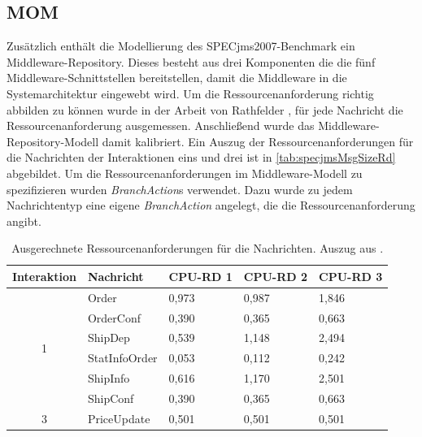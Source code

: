 \subsection{MOM}
Zusätzlich enthält die Modellierung des SPECjms2007-Benchmark ein Middleware-Repository. Dieses besteht aus drei Komponenten die die fünf Middleware-Schnittstellen bereitstellen, damit die Middleware in die Systemarchitektur eingewebt wird. Um die Ressourcenanforderung richtig abbilden zu können wurde in der Arbeit von Rathfelder \cite{Rathfelder2013}, für jede Nachricht die Ressourcenanforderung ausgemessen. Anschließend wurde das Middleware-Repository-Modell damit kalibriert. Ein Auszug der Ressourcenanforderungen für die Nachrichten der Interaktionen eins und drei ist in \autoref{tab:specjmsMsgSizeRd} abgebildet. Um die Ressourcenanforderungen im Middleware-Modell zu spezifizieren wurden \emph{BranchAction}s verwendet. Dazu wurde zu jedem Nachrichtentyp eine eigene \emph{BranchAction} angelegt, die die Ressourcenanforderung angibt. 

\begin{table}
\center
  \begin{tabular}{|c|l|l|l|l|}
  \hline
    \textbf{Interaktion} & \textbf{Nachricht} & \textbf{CPU-RD 1} & \textbf{CPU-RD 2} &\textbf{CPU-RD 3} \\
    \hline \hline
    \multirow{6}{*}{1} & Order & 0,973 & 0,987 & 1,846 \\\cline{2-5}
    & OrderConf & 0,390 & 0,365 & 0,663 \\\cline{2-5}
    & ShipDep & 0,539 & 1,148 & 2,494\\\cline{2-5}
    & StatInfoOrder & 0,053 & 0,112 & 0,242 \\\cline{2-5}
    & ShipInfo & 0,616 & 1,170 & 2,501 \\\cline{2-5}
    & ShipConf & 0,390 & 0,365 & 0,663  \\\hline
    \hline
     3 & PriceUpdate & 0,501 & 0,501 & 0,501 \\\hline
  \end{tabular}
	\caption{\label{tab:specjmsMsgSizeRd} Ausgerechnete Ressourcenanforderungen für die Nachrichten. Auszug aus \cite{Rathfelder2013}.}
\end{table}



